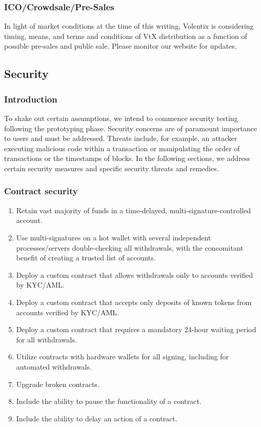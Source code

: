 \documentclass[]{article}
\begin{document}
{\begin{enumerate}
\begin{enumerate}
	\end{enumerate}
	
	
	
\end{enumerate}

\subsubsection {ICO/Crowdsale/Pre-Sales}

In light of market conditions at the time of this writing, Volentix is considering timing, means, and terms and conditions of VtX distribution as a function of possible pre-sales and public sale. Please monitor our website for updates. 


\subsection{Security}
\subsubsection{Introduction}
To shake out certain assumptions, we intend to commence security testing following the prototyping phase.
Security concerns are of paramount importance to users and must be addressed. 
Threats include, for example, an attacker executing malicious code within a transaction or manipulating the order of transactions or the timestamps of blocks. In the following sections, 
we address certain security measures and specific security threats and remedies. 
\subsubsection{Contract security}
\begin{enumerate}
	\item Retain vast majority of funds in a time-delayed, multi-signature-controlled account.
	\item Use multi-signatures on a hot wallet with several independent processes/servers double-checking all withdrawals, with the concomitant benefit of creating a trusted list of accounts.
	\item Deploy a custom contract that allows withdrawals only to accounts verified by KYC/AML.
	\item Deploy a custom contract that accepts only deposits of known tokens from accounts verified by KYC/AML.
	\item Deploy a custom contract that requires a mandatory 24-hour waiting period for all withdrawals.
	\item Utilize contracts with hardware wallets for all signing, including for automated withdrawals.
	\item Upgrade broken contracts.
	\item Include the ability to pause the functionality of a contract.
	\item Include the ability to delay an action of a contract.
\end{enumerate}
}
\end{document}

